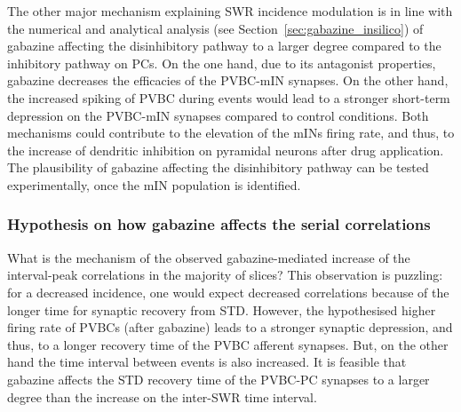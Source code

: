       The other major mechanism explaining SWR incidence modulation is in line
      with the numerical and analytical analysis (see
      Section~\ref{sec:gabazine_insilico}) of gabazine affecting the
      disinhibitory pathway to a larger degree compared to the inhibitory
      pathway on PCs. On the one hand, due to its antagonist properties,
      gabazine decreases the efficacies of the PVBC-mIN synapses. On the other
      hand, the increased spiking of PVBC during events would lead to a
      stronger short-term depression on the PVBC-mIN synapses compared to
      control conditions. Both mechanisms could contribute to the elevation of
      the mINs firing rate, and thus, to the increase of dendritic inhibition
      on pyramidal neurons after drug application. The plausibility of gabazine
      affecting the disinhibitory pathway can be tested experimentally, once
      the mIN population is identified.

    \subsubsection{Hypothesis on how gabazine affects the serial correlations} 
      What is the mechanism of the observed gabazine-mediated increase of the
      interval-peak correlations in the majority of slices? This observation is
      puzzling: for a decreased incidence, one would expect decreased
      correlations because of the longer time for synaptic recovery from STD.
      However, the hypothesised higher firing rate of PVBCs (after gabazine)
      leads to a stronger synaptic depression, and thus, to a longer recovery
      time of the PVBC afferent synapses. But, on the other hand the time
      interval between events is also increased. It is feasible that gabazine
      affects the STD recovery time of the PVBC-PC synapses to a larger
      degree than the increase on the inter-SWR time interval.
      

